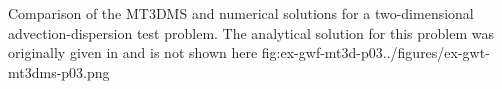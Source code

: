 \begin{StandardFigure}
	{Comparison of the MT3DMS and \mf numerical solutions for a two-dimensional advection-dispersion test problem.  The analytical solution for this problem was originally given in \cite{wilson1978} and is not shown here}
	{fig:ex-gwf-mt3d-p03}{../figures/ex-gwt-mt3dms-p03.png}
\end{StandardFigure}